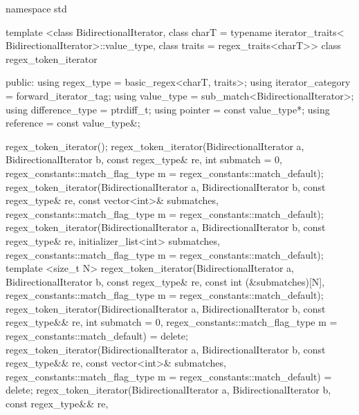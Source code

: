 \begin{codeblock}
namespace std {
  template <class BidirectionalIterator,
            class charT = typename iterator_traits<
              BidirectionalIterator>::value_type,
            class traits = regex_traits<charT>>
  class regex_token_iterator {
  public:
    using regex_type        = basic_regex<charT, traits>;
    using iterator_category = forward_iterator_tag;
    using value_type        = sub_match<BidirectionalIterator>;
    using difference_type   = ptrdiff_t;
    using pointer           = const value_type*;
    using reference         = const value_type&;

    regex_token_iterator();
    regex_token_iterator(BidirectionalIterator a, BidirectionalIterator b,
                        const regex_type& re,
                        int submatch = 0,
                        regex_constants::match_flag_type m =
                          regex_constants::match_default);
    regex_token_iterator(BidirectionalIterator a, BidirectionalIterator b,
                        const regex_type& re,
                        const vector<int>& submatches,
                        regex_constants::match_flag_type m =
                          regex_constants::match_default);
    regex_token_iterator(BidirectionalIterator a, BidirectionalIterator b,
                        const regex_type& re,
                        initializer_list<int> submatches,
                        regex_constants::match_flag_type m =
                          regex_constants::match_default);
    template <size_t N>
      regex_token_iterator(BidirectionalIterator a, BidirectionalIterator b,
                        const regex_type& re,
                        const int (&submatches)[N],
                        regex_constants::match_flag_type m =
                          regex_constants::match_default);
    regex_token_iterator(BidirectionalIterator a, BidirectionalIterator b,
                         const regex_type&& re,
                         int submatch = 0,
                         regex_constants::match_flag_type m =
                           regex_constants::match_default) = delete;
    regex_token_iterator(BidirectionalIterator a, BidirectionalIterator b,
                         const regex_type&& re,
                         const vector<int>& submatches,
                         regex_constants::match_flag_type m =
                           regex_constants::match_default) = delete;
    regex_token_iterator(BidirectionalIterator a, BidirectionalIterator b,
                         const regex_type&& re,
}}
\end{codeblock}
